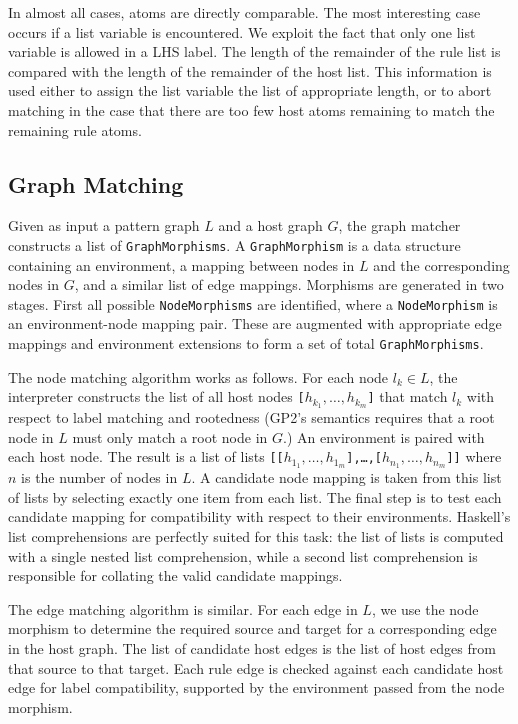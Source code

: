 In almost all cases, atoms are directly comparable. The most interesting case occurs if a list variable is encountered. We exploit the fact that only one list variable is allowed in a LHS label. The length of the remainder of the rule list is compared with the length of the remainder of the host list. This information is used either to assign the list variable the list of appropriate length, or to abort matching in the case that there are too few host atoms remaining to match the remaining rule atoms.

\subsection{Graph Matching}\label{sec:graph-match}

Given as input a pattern graph $L$ and a host graph $G$, the graph matcher constructs a list of \texttt{GraphMorphisms}. A \texttt{GraphMorphism} is a data structure containing an environment, a mapping between nodes in $L$ and the corresponding nodes in $G$, and a similar list of edge mappings. Morphisms are generated in two stages. First all possible \texttt{NodeMorphisms} are identified, where a \texttt{NodeMorphism} is an environment-node mapping pair. These are augmented with appropriate edge mappings and environment extensions to form a set of total \texttt{GraphMorphisms}.

The node matching algorithm works as follows. For each node $l_k \in L$, the interpreter constructs the list of all host nodes \texttt{[$h_{k_1}, \ldots, h_{k_m}$]} that match $l_k$ with respect to label matching and rootedness (GP2's semantics requires that a root node in $L$ must only match a root node in $G$.) An environment is paired with each host node. The result is a list of lists \texttt{[[$h_{1_1}, \ldots, h_{1_m}$],\ldots,[$h_{n_1}, \ldots, h_{n_m}$]]} where $n$ is the number of nodes in $L$. A candidate node mapping is taken from this list of lists by selecting exactly one item from each list. The final step is to test each candidate mapping for compatibility with respect to their environments. Haskell's list comprehensions are perfectly suited for this task: the list of lists is computed with a single nested list comprehension, while a second list comprehension is responsible for collating the valid candidate mappings. 

The edge matching algorithm is similar. For each edge in $L$, we use the node morphism to determine the required source and target for a corresponding edge in the host graph. The list of candidate host edges is the list of host edges from that source to that target. Each rule edge is checked against each candidate host edge for label compatibility, supported by the environment passed from the node morphism.


